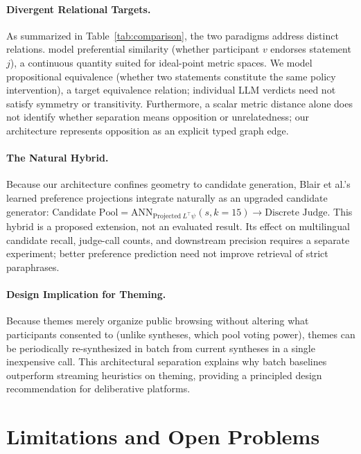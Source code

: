 \documentclass[11pt,a4paper]{article}
\begin{document}
\paragraph{Divergent Relational Targets.} As summarized in Table~\ref{tab:comparison}, the two paradigms address distinct relations. \citet{blair2026embeddings} model preferential similarity (whether participant $v$ endorses statement $j$), a continuous quantity suited for ideal-point metric spaces. We model propositional equivalence (whether two statements constitute the same policy intervention), a target equivalence relation; individual LLM verdicts need not satisfy symmetry or transitivity. Furthermore, a scalar metric distance alone does not identify whether separation means opposition or unrelatedness; our architecture represents opposition as an explicit typed graph edge.

\paragraph{The Natural Hybrid.} Because our architecture confines geometry to candidate generation, Blair et al.'s learned preference projections integrate naturally as an upgraded candidate generator: $\text{Candidate Pool} = \mathrm{ANN}_{\mathrm{Projected}\ L^\top \psi}(s, k=15) \rightarrow \text{Discrete Judge}$. This hybrid is a proposed extension, not an evaluated result. Its effect on multilingual candidate recall, judge-call counts, and downstream precision requires a separate experiment; better preference prediction need not improve retrieval of strict paraphrases.

\paragraph{Design Implication for Theming.} Because themes merely organize public browsing without altering what participants consented to (unlike syntheses, which pool voting power), themes can be periodically re-synthesized in batch from current syntheses in a single inexpensive call. This architectural separation explains why batch baselines outperform streaming heuristics on theming, providing a principled design recommendation for deliberative platforms.

\section{Limitations and Open Problems}
\end{document}
